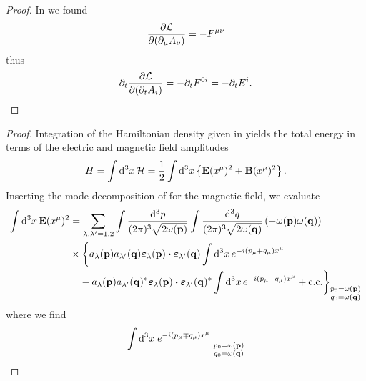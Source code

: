 \mwcoulombcanonicalmomentum
\begin{proof}
	In  we found
	\begin{equation*}
		\pdv{\mathcal{L}}{(\partial_\mu A_\nu)}
		=
		-
		F^{\mu\nu}
	\end{equation*}
	thus
	\begin{equation*}
		\partial_t
		\pdv{\mathcal{L}}{(\partial_tA_i)}
		=
		-
		\partial_t
		F^{0i}
		=
		-
		\partial_t
		E^i
		.
	\end{equation*}
\end{proof}
\mwenergy
\begin{proof}
	Integration of the Hamiltonian density given in  yields the total energy in terms of the electric and magnetic field amplitudes
	\begin{equation*}
		H
		=
		\int\dd[3]{x}
		\mathcal{H}
		=
		\frac{1}{2}
		\int\dd[3]{x}
		\left\{
			\vb{E}(x^\mu)^2
			+
			\vb{B}(x^\mu)^2
		\right\}
		.
	\end{equation*}
	Inserting the mode decomposition of  for the magnetic field, we evaluate
	\begin{equation*}
		\begin{split}
			\int\dd[3]{x}
			\vb{E}(x^\mu)^2
			&=
			\sum_{\lambda,\lambda^\prime=1,2}
			\int\frac{\dd[3]{p}}{(2\pi)^3\sqrt{2\omega(\vb{p})}}
			\int\frac{\dd[3]{q}}{(2\pi)^3\sqrt{2\omega(\vb{q})}}
			\left(
				-
				\omega(\vb{p})
				\omega(\vb{q})
			\right)
			\\
			&\times
			\biggl\{
				a_\lambda(\vb{p})
				a_{\lambda^\prime}(\vb{q})
				\boldsymbol{\varepsilon}_\lambda(\vb{p})
				\vdot
				\boldsymbol{\varepsilon}_{\lambda^\prime}(\vb{q})
				\int\dd[3]{x}
				e^{-i(p_\mu+q_\mu)x^\mu}
				\\
				& \ \ \
				-
				a_\lambda(\vb{p})
				a_{\lambda^\prime}(\vb{q})^*
				\boldsymbol{\varepsilon}_\lambda(\vb{p})
				\vdot
				\boldsymbol{\varepsilon}_{\lambda^\prime}(\vb{q})^*
				\int\dd[3]{x}
				e^{-i(p_\mu-q_\mu)x^\mu}
				+
				\text{c.c.}
			\biggr\}_{\substack{p_0=\omega(\vb{p})\\q_0=\omega(\vb{q})}}
		\end{split}
	\end{equation*}
	where we find
	\begin{equation*}
		\begin{split}
			\int\dd[3]{x}
			\eval{e^{-i(p_\mu\mp q_\mu)x^\mu}}_{\substack{p_0=\omega(\vb{p})\\q_0=\omega(\vb{q})}}

\end{split}
\end{equation*}
\end{proof}
